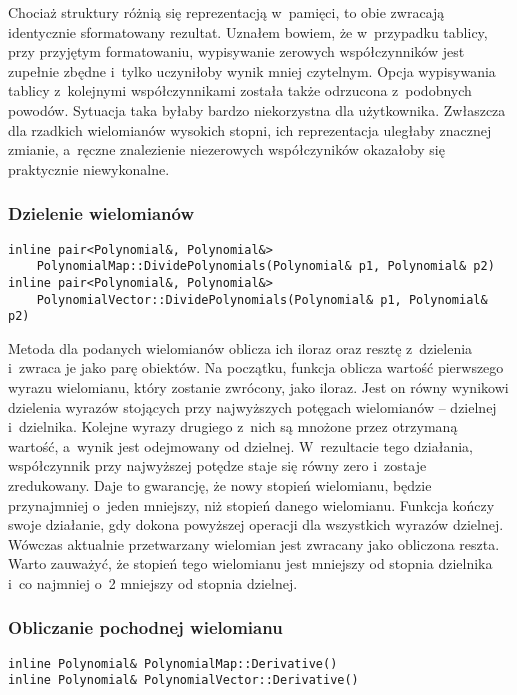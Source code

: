 Chociaż struktury różnią się reprezentacją w~pamięci, to obie zwracają identycznie sformatowany rezultat. Uznałem bowiem, że w~przypadku tablicy, przy przyjętym formatowaniu, wypisywanie zerowych współczynników jest zupełnie zbędne i~tylko uczyniłoby wynik mniej czytelnym. Opcja wypisywania tablicy z~kolejnymi współczynnikami została także odrzucona z~podobnych powodów. Sytuacja taka byłaby bardzo niekorzystna dla użytkownika. Zwłaszcza dla rzadkich wielomianów wysokich stopni, ich reprezentacja uległaby znacznej zmianie, a~ręczne znalezienie niezerowych współczyników okazałoby się praktycznie niewykonalne.

\subsubsection{Dzielenie wielomianów}
\begin{lstlisting}
inline pair<Polynomial&, Polynomial&>
    PolynomialMap::DividePolynomials(Polynomial& p1, Polynomial& p2)
inline pair<Polynomial&, Polynomial&>
    PolynomialVector::DividePolynomials(Polynomial& p1, Polynomial& p2)
\end{lstlisting}

Metoda dla podanych wielomianów oblicza ich iloraz oraz resztę z~dzielenia i~zwraca je jako parę obiektów. Na początku, funkcja oblicza wartość pierwszego wyrazu wielomianu, który zostanie zwrócony, jako iloraz. Jest on równy wynikowi dzielenia wyrazów stojących przy najwyższych potęgach wielomianów – dzielnej i~dzielnika. Kolejne wyrazy drugiego z~nich są mnożone przez otrzymaną wartość, a~wynik jest odejmowany od dzielnej. W~rezultacie tego działania, współczynnik przy najwyższej potędze staje się równy zero i~zostaje zredukowany. Daje to gwarancję, że nowy stopień wielomianu, będzie przynajmniej o~jeden mniejszy, niż stopień danego wielomianu. Funkcja kończy swoje działanie, gdy dokona powyższej operacji dla wszystkich wyrazów dzielnej. Wówczas aktualnie przetwarzany wielomian jest zwracany jako obliczona reszta. Warto zauważyć, że stopień tego wielomianu jest mniejszy od stopnia dzielnika i~co najmniej o~2 mniejszy od stopnia dzielnej.

\subsubsection{Obliczanie pochodnej wielomianu}
\begin{lstlisting}
inline Polynomial& PolynomialMap::Derivative()
inline Polynomial& PolynomialVector::Derivative()
\end{lstlisting}

